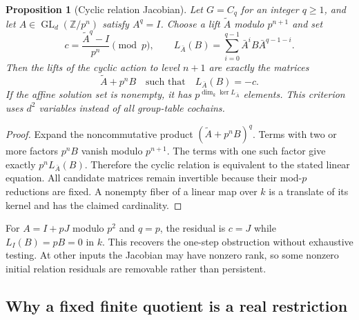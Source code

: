 \documentclass[11pt]{article}
\newtheorem{proposition}[theorem]{Proposition}
\theoremstyle{definition}
\theoremstyle{remark}
\begin{document}
\begin{proposition}[Cyclic relation Jacobian]\label{prop:cyclic-jacobian}
Let $G=C_q$ for an integer $q\geq1$, and let $A\in\operatorname{GL}_d(\mathbb Z/p^n)$ satisfy $A^q=I$. Choose a lift $\widetilde A$ modulo $p^{n+1}$ and set
\[
 c=\frac{\widetilde A^q-I}{p^n}\pmod p,
 \qquad L_{\bar A}(B)=\sum_{i=0}^{q-1}\bar A^iB\bar A^{q-1-i}.
\]
Then the lifts of the cyclic action to level $n+1$ are exactly the matrices
\[
 \widetilde A+p^nB\quad\text{such that}\quad L_{\bar A}(B)=-c.
\]
If the affine solution set is nonempty, it has $p^{\dim_k\ker L_{\bar A}}$ elements. This criterion uses $d^2$ variables instead of all group-table cochains.
\end{proposition}
\begin{proof}
Expand the noncommutative product $(\widetilde A+p^nB)^q$. Terms with two or more factors $p^nB$ vanish modulo $p^{n+1}$. The terms with one such factor give exactly $p^nL_{\bar A}(B)$. Therefore the cyclic relation is equivalent to the stated linear equation. All candidate matrices remain invertible because their mod-$p$ reductions are fixed. A nonempty fiber of a linear map over $k$ is a translate of its kernel and has the claimed cardinality.
\end{proof}

For $A=I+pJ$ modulo $p^2$ and $q=p$, the residual is $c=J$ while $L_I(B)=pB=0$ in $k$. This recovers the one-step obstruction without exhaustive testing. At other inputs the Jacobian may have nonzero rank, so some nonzero initial relation residuals are removable rather than persistent.

\subsection{Why a fixed finite quotient is a real restriction}
\end{document}
